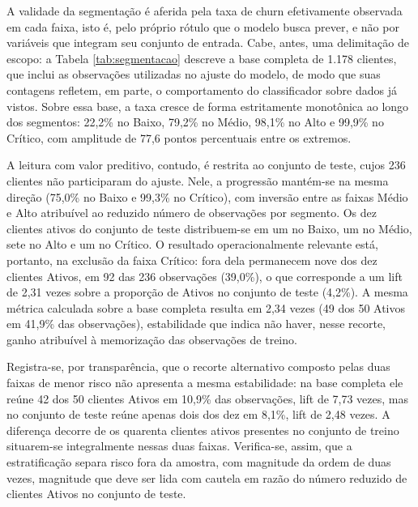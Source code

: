 A validade da segmentação é aferida pela taxa de churn efetivamente observada em cada faixa, isto é, pelo próprio rótulo que o modelo busca prever, e não por variáveis que integram seu conjunto de entrada. Cabe, antes, uma delimitação de escopo: a Tabela \ref{tab:segmentacao} descreve a base completa de 1.178 clientes, que inclui as observações utilizadas no ajuste do modelo, de modo que suas contagens refletem, em parte, o comportamento do classificador sobre dados já vistos. Sobre essa base, a taxa cresce de forma estritamente monotônica ao longo dos segmentos: 22,2\% no Baixo, 79,2\% no Médio, 98,1\% no Alto e 99,9\% no Crítico, com amplitude de 77,6 pontos percentuais entre os extremos.

A leitura com valor preditivo, contudo, é restrita ao conjunto de teste, cujos 236 clientes não participaram do ajuste. Nele, a progressão mantém-se na mesma direção (75,0\% no Baixo e 99,3\% no Crítico), com inversão entre as faixas Médio e Alto atribuível ao reduzido número de observações por segmento. Os dez clientes ativos do conjunto de teste distribuem-se em um no Baixo, um no Médio, sete no Alto e um no Crítico. O resultado operacionalmente relevante está, portanto, na exclusão da faixa Crítico: fora dela permanecem nove dos dez clientes Ativos, em 92 das 236 observações (39,0\%), o que corresponde a um lift de 2,31 vezes sobre a proporção de Ativos no conjunto de teste (4,2\%). A mesma métrica calculada sobre a base completa resulta em 2,34 vezes (49 dos 50 Ativos em 41,9\% das observações), estabilidade que indica não haver, nesse recorte, ganho atribuível à memorização das observações de treino.

Registra-se, por transparência, que o recorte alternativo composto pelas duas faixas de menor risco não apresenta a mesma estabilidade: na base completa ele reúne 42 dos 50 clientes Ativos em 10,9\% das observações, lift de 7,73 vezes, mas no conjunto de teste reúne apenas dois dos dez em 8,1\%, lift de 2,48 vezes. A diferença decorre de os quarenta clientes ativos presentes no conjunto de treino situarem-se integralmente nessas duas faixas. Verifica-se, assim, que a estratificação separa risco fora da amostra, com magnitude da ordem de duas vezes, magnitude que deve ser lida com cautela em razão do número reduzido de clientes Ativos no conjunto de teste.

